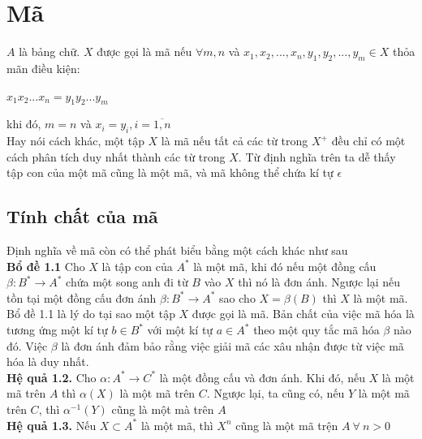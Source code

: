 \documentclass[14pt]{extreport}
\begin{document}
\section{Mã}
$A$ là bảng chữ. $X$ được gọi là mã nếu $\forall m,n$ và $x_1,x_2,...,x_n,y_1,y_2,...,y_m \in X$ thỏa mãn điều kiện:
\begin{center}
$x_1x_2...x_n=y_1y_2...y_m$
\end{center}
khi đó, $m=n$ và $x_i=y_i,i=\overline{1,n}$ \\
Hay nói cách khác, một tập $X$ là mã nếu tất cả các từ trong $X^+$ đều chỉ có một cách phân tích duy nhất thành các từ trong $X$.
Từ định nghĩa trên ta dễ thấy tập con của một mã cũng là một mã, và mã không thể chứa kí tự $\epsilon$
\subsection{Tính chất của mã}
Định nghĩa về mã còn có thể phát biểu bằng một cách khác như sau\\
\textbf{Bổ đề 1.1} Cho $X$ là tập con của $A^*$ là một mã, khi đó nếu một đồng cấu $\beta : B^* \rightarrow A^*$ chứa một song anh đi từ $B$ vào $X$ thì nó là đơn ánh. Ngược lại nếu tồn tại một đồng cấu đơn ánh $\beta : B^* \rightarrow A^*$ sao cho $X = \beta(B)$ thì $X$ là một mã. \\
Bổ đề 1.1 là lý do tại sao một tập $X$ được gọi là mã. Bản chất của việc mã hóa là tương ứng một kí tự $b \in B^*$ với một kí tự $a \in A^*$ theo một quy tắc mã hóa $\beta$ nào đó. Việc $\beta$ là đơn ánh đảm bảo rằng việc giải mã các xâu nhận được từ việc mã hóa là duy nhất.\\

\textbf{Hệ quả 1.2.} Cho $\alpha : A^* \rightarrow C^*$ là một đồng cấu và đơn ánh. Khi đó, nếu $X$ là một mã trên $A$ thì $\alpha (X)$ là một mã trên $C$. Ngược lại, ta cũng có, nếu $Y$ là một mã trên $C$, thì $\alpha^{-1}(Y)$ cũng là một mà trên $A$ \\

\textbf{Hệ quả 1.3.} Nếu $X \subset A^*$ là một mã, thì $X^n$ cũng là một mã trện $A \ \forall \ n > 0$
\end{document}
